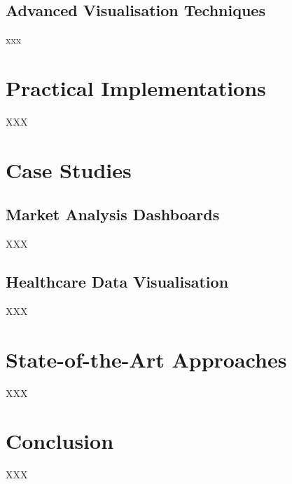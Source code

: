 \documentclass{article}\usepackage[]{graphicx}\usepackage[]{xcolor}
\begin{document}
\subsection{Advanced Visualisation Techniques}
xxx




\section{Practical Implementations}
XXX




\section{Case Studies}
\subsection{Market Analysis Dashboards}
XXX
\subsection{Healthcare Data Visualisation}
XXX




\section{State-of-the-Art Approaches}
XXX



\section{Conclusion}
XXX
\end{document}
